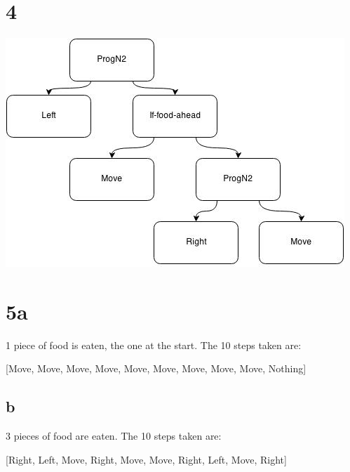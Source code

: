 \documentclass[12pt]{article}
\begin{document}
\section{4}
\includegraphics{problem4}

\section{5a}
1 piece of food is eaten, the one at the start.  The 10 steps taken are:
\begin{center}
[Move, Move, Move, Move, Move, Move, Move, Move, Move, Nothing]
\end{center}

\subsection{b}
3 pieces of food are eaten.  The 10 steps taken are:
\begin{center}
[Right, Left, Move, Right, Move, Move, Right, Left, Move, Right]
\end{center}
\end{document}
